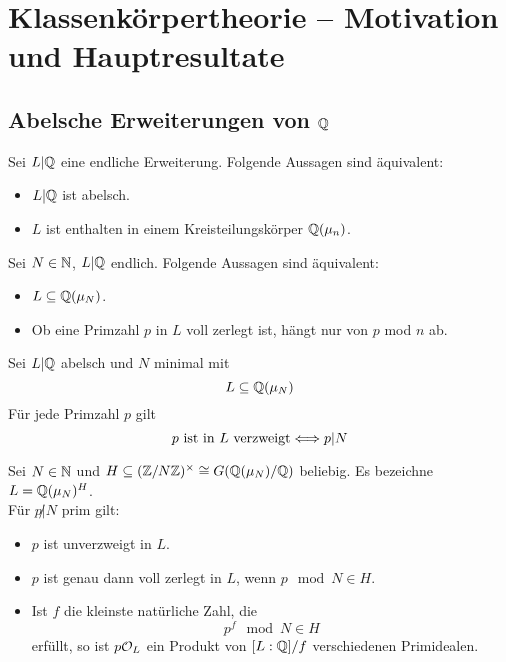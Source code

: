 \chapter{Klassenkörpertheorie -- Motivation und Hauptresultate}
\section{Abelsche Erweiterungen von $\mathbb{Q}$}
Sei $L|\mathbb{Q}$ eine endliche Erweiterung. Folgende Aussagen sind äquivalent:
\begin{itemize}
	\item $L|\mathbb{Q}$ ist abelsch.
	\item $L$ ist enthalten in einem Kreisteilungskörper $\mathbb{Q}(\mu_n)$.
\end{itemize}

\Satz{}
Sei $N \in \mathbb{N}$, $L |\mathbb{Q}$ endlich. Folgende Aussagen sind äquivalent:
\begin{itemize}
	\item $L \subseteq \mathbb{Q}(\mu_N)$.
	\item Ob eine Primzahl $p$ in $L$ voll zerlegt ist, hängt nur von $p$ mod $n$ ab.
\end{itemize}

\Satz{}
Sei $L|\mathbb{Q}$ abelsch und $N$ minimal mit
\[ L \subseteq \mathbb{Q}(\mu_N) \]
Für jede Primzahl $p$ gilt
\[ p \text{ ist in }L \text{ verzweigt} \overset{}{\Longleftrightarrow} p|N \]

\Satz{}
Sei $N \in \mathbb{N}$ und $H \subseteq (\mathbb{Z}/N\mathbb{Z})^\times \overset{}{\cong} G(\mathbb{Q}(\mu_N) / \mathbb{Q})$ beliebig. Es bezeichne $L = \mathbb{Q}(\mu_N)^H$.\\
Für $p\not | N$ prim gilt:
\begin{itemize}
	\item $p$ ist unverzweigt in $L$.
	\item $p$ ist genau dann voll zerlegt in $L$, wenn $p\mod{N} \in H$.
	\item Ist $f$ die kleinste natürliche Zahl, die
	\[ p^f \mod{N} \in H \]
	erfüllt, so ist $p\mathcal{O}_L$ ein Produkt von $[L:\mathbb{Q}]/f$ verschiedenen Primidealen. 
\end{itemize}

